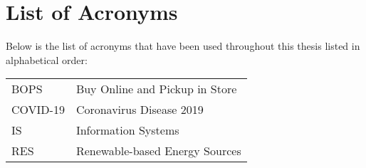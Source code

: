 
\thispagestyle{plain}			%
\chapter*{List of Acronyms}
Below is the list of acronyms that have been used throughout this thesis listed in alphabetical order:
\vspace*{1.0cm}

\begin{tabular}{p{3cm}p{12cm}}
BOPS & Buy Online and Pickup in Store \\
COVID-19 & Coronavirus Disease 2019 \\
IS & Information Systems \\
RES & Renewable-based Energy Sources\\
\end{tabular}


\thispagestyle{empty}
\mbox{}

